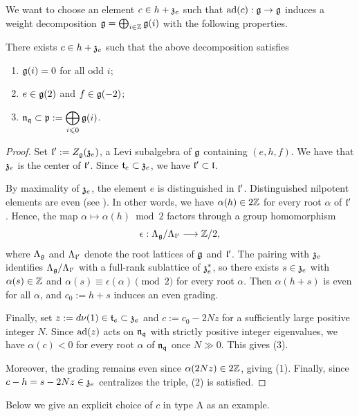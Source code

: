 \documentclass[11pt]{article}
\numberwithin{equation}{section}
\begin{document}
We want to choose an element $c\in h+\mathfrak{z}_e$ such that
$\operatorname{ad}(c):\mathfrak{g}\to\mathfrak{g}$ induces a weight decomposition
$\mathfrak{g}=\bigoplus_{i\in\mathbb{Z}}\mathfrak{g}(i)$ with the following properties.

\begin{lem}\label{choose grading}
There exists $c\in h+\mathfrak{z}_e$ such that the above decomposition
satisfies
\begin{enumerate}
    \item $\mathfrak{g}(i)=0$ for all odd $i$;
    \item $e\in\mathfrak{g}(2)$ and $f\in\mathfrak{g}(-2)$;
    \item $\mathfrak{n}_{\mathfrak{q}}\subset
    \mathfrak{p}:=\displaystyle\bigoplus_{i\leqslant0}\mathfrak{g}(i)$.
\end{enumerate}
\end{lem}

\begin{proof}
Set $\mathfrak{l}':=Z_{\mathfrak{g}}(\mathfrak{z}_e)$, a Levi subalgebra of $\mathfrak{g}$ containing
$(e,h,f)$. We have that $\mathfrak{z}_e$ is the center of $\mathfrak{l}'$.
Since $\mathfrak{t}_e\subset\mathfrak{z}_e$, we have $\mathfrak{l}'\subset \mathfrak{l}$.

By maximality of $\mathfrak{z}_e$, the element $e$ is distinguished in
$\mathfrak{l}'$. Distinguished nilpotent elements are even
(see \cite[Theorem 8.2.3]{collingwood1993nilpotent}). In other words, we have $\alpha(h)\in2\mathbb{Z}$ for every root $\alpha$ of $\mathfrak{l}'$. Hence, the map $\alpha\mapsto\alpha(h)\bmod 2$ factors through a
group homomorphism
\[
\epsilon:\Lambda_{\mathfrak{g}}/\Lambda_{\mathfrak{l}'}\longrightarrow\mathbb{Z}/2 ,
\]
where $\Lambda_{\mathfrak{g}}$ and $\Lambda_{\mathfrak{l}'}$ denote the root lattices of $\mathfrak{g}$ and
$\mathfrak{l}'$. The pairing with $\mathfrak{z}_e$ identifies $\Lambda_{\mathfrak{g}}/\Lambda_{\mathfrak{l}'}$ with a
full-rank sublattice of $\mathfrak{z}_e^*$, so there exists $s\in\mathfrak{z}_e$ with
$\alpha(s)\in \mathbb{Z}$ and $\alpha(s)\equiv\epsilon(\alpha)\pmod 2$ for every root $\alpha$. Then
$\alpha(h+s)$ is even for all $\alpha$, and $c_0:=h+s$ induces an even grading.

Finally, set $z:=d\nu(1)\in\mathfrak{t}_e\subset\mathfrak{z}_e$ and $c:=c_0-2Nz$ for a sufficiently large positive integer $N$.
Since $\operatorname{ad}(z)$ acts on $\mathfrak{n}_{\mathfrak{q}}$ with strictly positive
integer eigenvalues, we have $\alpha(c)<0$ for every root
$\alpha$ of $\mathfrak{n}_{\mathfrak{q}}$ once $N\gg0$. This gives (3).

Moreover, the grading remains even since
$\alpha(2Nz)\in2\mathbb{Z}$, giving (1).
Finally, since $c-h=s-2Nz\in\mathfrak{z}_e$ centralizes the triple, (2) is satisfied.
\end{proof}
Below we give an explicit choice of $c$ in type A as an example. 
\end{document}
